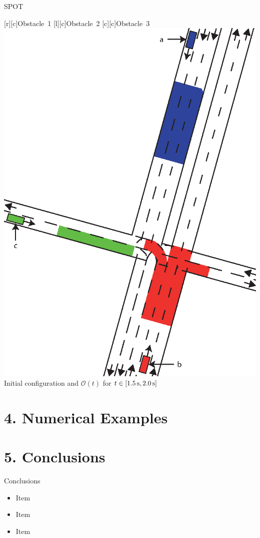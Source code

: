 \documentclass[shortpres,aspectratio=43]{beamer}
\begin{document}
\begin{frame}{SPOT}
\begin{center}
	{\footnotesize
	[c]{Obstacle~1}	
	[c]{Obstacle~2}
	[c]{Obstacle~3}
	\includegraphics[height=0.5\textheight]{./figures/Scenario_Intersection_Occ_1,5-2,0s_final.eps}
	} \\
	\vspace{1em}
	Initial configuration and $\mathcal{O}(t)$ for $t \in [\unit[1.5]{s}, \unit[2.0]{s}]$
\end{center}

\end{frame}

\section{4. Numerical Examples}



\section{5. Conclusions}
\begin{frame}{Conclusions}

\begin{itemize}
\item Item
\vfill \item  Item
\vfill \item  Item
\end{itemize}

\end{frame}
\end{document}

